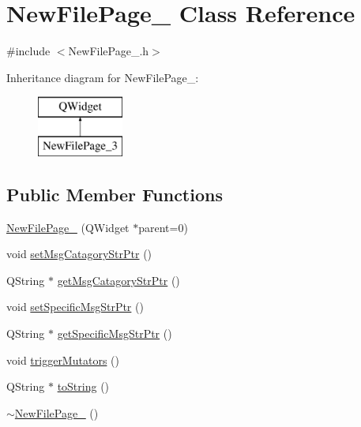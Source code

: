 \hypertarget{class_new_file_page__3}{\section{New\-File\-Page\-\_ Class Reference}
\label{class_new_file_page__3}
}


{\ttfamily \#include $<$New\-File\-Page\-\_.\-h$>$}

Inheritance diagram for New\-File\-Page\-\_\-:\begin{figure}[H]
\begin{center}
\leavevmode
\includegraphics[height=2.000000cm]{class_new_file_page__3}
\end{center}
\end{figure}
\subsection*{Public Member Functions}
\begin{DoxyCompactItemize}
\item 
\hyperlink{class_new_file_page__3_a5f95cfa958e66c0908b5f07e888e2b18}{New\-File\-Page\-\_} (Q\-Widget $\ast$parent=0)
\item 
void \hyperlink{class_new_file_page__3_ab33ffb9bdcf669abd91d83bbdaffb232}{set\-Msg\-Catagory\-Str\-Ptr} ()
\item 
Q\-String $\ast$ \hyperlink{class_new_file_page__3_aa175534ea8aca4e3c2bc609f8a8892e7}{get\-Msg\-Catagory\-Str\-Ptr} ()
\item 
void \hyperlink{class_new_file_page__3_a42f57bfe122d2ea9163077a605d0fb20}{set\-Specific\-Msg\-Str\-Ptr} ()
\item 
Q\-String $\ast$ \hyperlink{class_new_file_page__3_ac63caca4f0f994ff5800cf90134e2993}{get\-Specific\-Msg\-Str\-Ptr} ()
\item 
void \hyperlink{class_new_file_page__3_a843704494f9ed68d86cb6ba0119b070b}{trigger\-Mutators} ()
\item 
Q\-String $\ast$ \hyperlink{class_new_file_page__3_a99c2ef9f88b626e06d616bfba4337497}{to\-String} ()
\item 
\hyperlink{class_new_file_page__3_a275afd63a9b329699b95892e5850651f}{$\sim$\-New\-File\-Page\-\_} ()
\end{DoxyCompactItemize}
